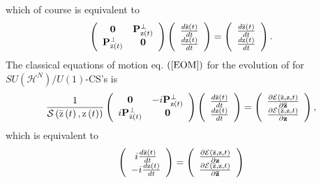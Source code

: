\documentclass[aps,preprint]{revtex4}%
\begin{document}
which of course is equivalent to
\begin{equation}
\left(
\begin{array}
[c]{cc}%
\mathbf{0} & \mathbf{P}_{\mathrm{z}\left(  t\right)  }^{\bot}\\
\mathbf{P}_{\mathrm{\bar{z}}\left(  t\right)  }^{\bot} & \mathbf{0}%
\end{array}
\right)  \left(
\begin{array}
[c]{c}%
\frac{d\mathrm{\bar{z}}\left(  t\right)  }{dt}\\
\frac{d\mathrm{z}\left(  t\right)  }{dt}%
\end{array}
\right)  =\left(
\begin{array}
[c]{c}%
\frac{d\mathrm{\bar{z}}\left(  t\right)  }{dt}\\
\frac{d\mathrm{z}\left(  t\right)  }{dt}%
\end{array}
\right)  . \label{orthog3}%
\end{equation}
The classical equations of motion eq. $\left(  \ref{EOM}\right)  $ for the
evolution of for $SU\left(  \mathcal{H}^{N}\right)  /U\left(  1\right)  $-CS's
is
\begin{equation}
\frac{1}{\mathcal{S}\left(  \mathrm{\bar{z}}\left(  t\right)  \mathrm{,z}%
\left(  t\right)  \right)  }\left(
\begin{array}
[c]{cc}%
\mathbf{0} & -i\mathbf{P}_{\mathrm{z}\left(  t\right)  }^{\bot}\\
i\mathbf{P}_{\mathrm{\bar{z}}\left(  t\right)  }^{\bot} & \mathbf{0}%
\end{array}
\right)  \left(
\begin{array}
[c]{c}%
\frac{d\mathrm{\bar{z}}\left(  t\right)  }{dt}\\
\frac{d\mathrm{z}\left(  t\right)  }{dt}%
\end{array}
\right)  =\left(
\begin{array}
[c]{c}%
\frac{\partial\mathcal{E}\left(  \mathrm{\bar{z},z}\mathbf{,}t\right)
}{\partial\mathbf{\bar{z}}}\\
\frac{\partial\mathcal{E}\left(  \mathrm{\bar{z},z}\mathbf{,}t\right)
}{\partial\mathbf{z}}%
\end{array}
\right)  , \label{EOM1}%
\end{equation}
which is equivalent to
\begin{equation}
\left(
\begin{array}
[c]{c}%
i\frac{d\mathrm{\bar{z}}\left(  t\right)  }{dt}\\
-i\frac{d\mathrm{z}\left(  t\right)  }{dt}%
\end{array}
\right)  =\left(
\begin{array}
[c]{c}%
\frac{\partial\mathcal{E}\left(  \mathrm{\bar{z},z}\mathbf{,}t\right)
}{\partial\mathbf{z}}\\
\frac{\partial\mathcal{E}\left(  \mathrm{\bar{z},z}\mathbf{,}t\right)
}{\partial\mathbf{\bar{z}}}%
\end{array}
\right)
\end{equation}
\end{document}
